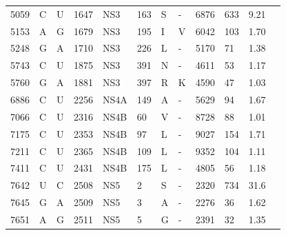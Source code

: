 \begin{longtabu}{X[l]X[l]X[l]X[l]X[l]X[l]X[l]X[l]X[l]X[l]X[l]X[l]}
		5059     & C    & U            & 1647              & NS3   & 163         & S                  & -                 & 6876           & 633              & 9.21   \\
		5153     & A    & G          & 1679              & NS3   & 195         & I                  & V               & 6042           & 103              & 1.70   \\
		5248     & G    & A            & 1710              & NS3   & 226         & L                  & -                 & 5170           & 71               & 1.38   \\
		5743     & C    & U            & 1875              & NS3   & 391         & N                  & -                 & 4611           & 53               & 1.17   \\
		5760     & G    & A            & 1881              & NS3   & 397         & R                  & K               & 4590           & 47               & 1.03   \\
		6886     & C    & U            & 2256              & NS4A  & 149         & A                  & -                 & 5629           & 94               & 1.67   \\
		7066     & C    & U            & 2316              & NS4B  & 60          & V                  & -                 & 8728           & 88               & 1.01   \\
		7175     & C    & U            & 2353              & NS4B  & 97          & L                  & -                 & 9027           & 154              & 1.71   \\
		7211     & C    & U            & 2365              & NS4B  & 109         & L                  & -                 & 9352           & 104              & 1.11   \\
		7411     & C    & U            & 2431              & NS4B  & 175         & L                  & -                 & 4805           & 56               & 1.18   \\
		7642     & U    & C         & 2508              & NS5   & 2           & S                  & -                 & 2320           & 734              & 31.6   \\
		7645     & G    & A            & 2509              & NS5   & 3           & A                  & -                 & 2276           & 36               & 1.62   \\
		7651     & A    & G            & 2511              & NS5   & 5           & G                  & -                 & 2391           & 32               & 1.35   \\

\end{longtabu}
